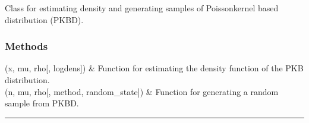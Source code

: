 \documentclass[letterpaper,10pt,english,openany,oneside]{sphinxmanual}
\begin{document}
\begin{fulllineitems}
\label{\detokenize{api_reference/generated/QuadratiK.spherical_clustering.PKBD:QuadratiK.spherical_clustering.PKBD}}
\pysigstartsignatures
{}
\pysigstopsignatures
\sphinxAtStartPar
Class for estimating density and generating samples of Poisson\sphinxhyphen{}kernel based distribution (PKBD).

\end{fulllineitems}

\subsubsection*{Methods}


\begin{savenotes}\sphinxattablestart
\sphinxthistablewithglobalstyle
\sphinxthistablewithnovlinesstyle
\centering
\begin{tabulary}{\linewidth}[t]{}
\sphinxtoprule
\sphinxtableatstartofbodyhook
\sphinxAtStartPar
{\hyperref[\detokenize{api_reference/generated/QuadratiK.spherical_clustering.PKBD:QuadratiK.spherical_clustering.PKBD.dpkb}]{}}(x, mu, rho{[}, logdens{]})
&
\sphinxAtStartPar
Function for estimating the density function of the PKB distribution.
\\
\sphinxhline
\sphinxAtStartPar
{\hyperref[\detokenize{api_reference/generated/QuadratiK.spherical_clustering.PKBD:QuadratiK.spherical_clustering.PKBD.rpkb}]{}}(n, mu, rho{[}, method, random\_state{]})
&
\sphinxAtStartPar
Function for generating a random sample from PKBD.
\\
\sphinxbottomrule
\end{tabulary}
\sphinxtableafterendhook\par
\sphinxattableend\end{savenotes}


\bigskip\hrule\bigskip

\end{document}
